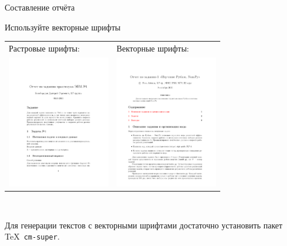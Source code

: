 \documentclass[fleqn, xcolor=x11names]{beamer}
\begin{document}
\begin{section}{Составление отчёта}
\begin{frame}{Используйте векторные шрифты}
\tabcolsep=10pt
\begin{tabular}{ll}
    Растровые шрифты: & Векторные шрифты: \\
    \includegraphics[width=4.5cm]{bitmap_fonts.pdf} & \includegraphics[width=4.5cm]{vector_fonts.pdf}
\end{tabular}

\

Для генерации текстов с векторными шрифтами достаточно установить пакет \TeX\ \texttt{cm-super}.
\end{frame}

\end{section}
\end{document}
